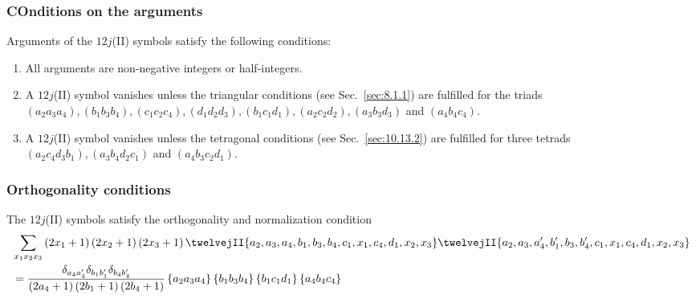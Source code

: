 \subsubsection{COnditions on the arguments} 
Arguments of the $12j$(II) symbols satisfy the following conditions:
\begin{enumerate}[label=(\roman*)]
\item All arguments are non-negative integers or half-integers.
\item A $12j$(II) symbol vanishes unless the triangular conditions (see Sec.~\ref{sec:8.1.1}) are fulfilled for the triads $\left(a_{2} a_{3} a_{4}\right),\left(b_{1} b_{3} b_{4}\right),\left(c_{1} c_{2} c_{4}\right),\left(d_{1} d_{2} d_{3}\right),\left(b_{1} c_{1} d_{1}\right),\left(a_{2} c_{2} d_{2}\right),\left(a_{3} b_{3} d_{3}\right)$ and $\left(a_{4} b_{4} c_{4}\right)$.\\
\item A $12j$(II) symbol vanishes unless the tetragonal conditions (see Sec.~\ref{sec:10.13.2}) are fulfilled for three tetrads $\left(a_{2} c_{4} d_{3} b_{1}\right),\left(a_{3} b_{4} d_{2} c_{1}\right)$ and $\left(a_{4} b_{3} c_{2} d_{1}\right)$.
\end{enumerate}

\subsubsection{Orthogonality conditions}
The $12j$(II) symbols satisfy the orthogonality and normalization condition
\begin{align}
& \sum_{x_{1} x_{2} x_{3}}\left(2 x_{1}+1\right)\left(2 x_{2}+1\right)\left(2 x_{3}+1\right)\twelvejII{a_{2},a_{3},a_{4},b_{1},b_{3},b_{4},c_{1},x_{1},c_{4},d_{1},x_{2},x_{3}}\twelvejII{a_{2},a_{3},a_{4}^{\prime},b_{1}^{\prime},b_{3},b_{4}^{\prime},c_{1},x_{1},c_{4},d_{1},x_{2},x_{3}}  \notag\\
& =\frac{\delta_{a_{4} a_{4}^{\prime}} \delta_{b_{1} b_{1}^{\prime}} \delta_{b_{4} b_{4}^{\prime}}}{\left(2 a_{4}+1\right)\left(2 b_{1}+1\right)\left(2 b_{4}+1\right)}\left\{a_{2} a_{3} a_{4}\right\}\left\{b_{1} b_{3} b_{4}\right\}\left\{b_{1} c_{1} d_{1}\right\}\left\{a_{4} b_{4} c_{4}\right\} \label{eq:10:13:25}
\end{align}

